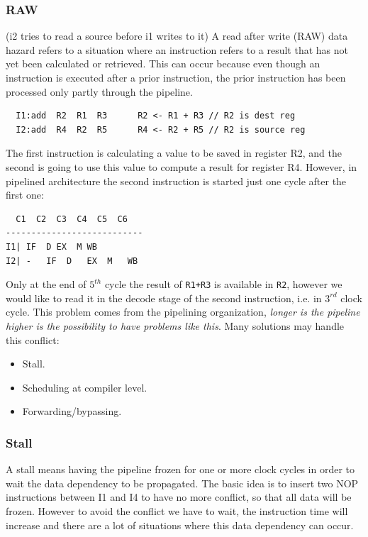 \subsubsection{RAW}
(i2 tries to read a source before i1 writes to it) A read after write (RAW) data
hazard refers to a situation where an instruction refers to a result that has
not yet been calculated or retrieved. This can occur because even though an
instruction is executed after a prior instruction, the prior instruction has
been processed only partly through the pipeline.
\begin{verbatim}
  I1:add  R2  R1  R3      R2 <- R1 + R3 // R2 is dest reg
  I2:add  R4  R2  R5      R4 <- R2 + R5 // R2 is source reg
\end{verbatim}
The first instruction is calculating a value to be saved in register R2, and the
second is going to use this value to compute a result for register R4. However,
in pipelined architecture the second instruction is started just one cycle after
the first one:
\begin{verbatim}
  C1  C2  C3  C4  C5  C6
---------------------------
I1| IF  D EX  M WB
I2| -   IF  D   EX  M   WB
\end{verbatim}

Only at the end of $5^{th}$ cycle the result of \verb|R1+R3| is available in
\verb|R2|, however we would like to read it in the decode stage of the second
instruction, i.e. in $3^{rd}$ clock cycle. This problem comes from the
pipelining organization, \textit{longer is the pipeline higher is the
possibility to have problems like this}. Many solutions may handle this
conflict:
\begin{itemize}
  \item Stall.
  \item Scheduling at compiler level.
  \item Forwarding/bypassing.
\end{itemize}

\subsubsection{Stall}
  A stall means having the pipeline frozen for one or more clock cycles in order
  to wait the data dependency to be propagated. The basic idea is to insert two
  NOP instructions between I1 and I4 to have no more conflict, so that all data
  will be frozen. However to avoid the conflict we have to wait, the instruction
  time will increase and there are a lot of situations where this data
  dependency can occur.

